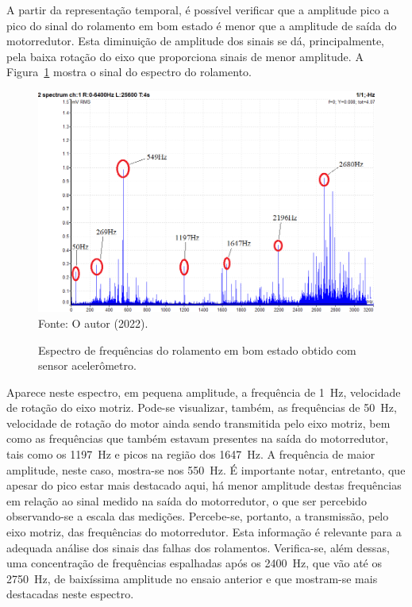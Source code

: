 \documentclass[
	12pt,				
	oneside,			
	a4paper,			
	english,			
	brazil,	
	sumario=abnt-6027-2012		
	]{abntex2ppgsi}
\begin{document}
A partir da representação temporal, é possível verificar que a amplitude pico a pico do sinal do rolamento em bom estado é menor que a amplitude de saída do motorredutor. Esta diminuição de amplitude dos sinais se dá, principalmente, pela baixa rotação do eixo que proporciona sinais de menor amplitude. A Figura~\ref{ROLAMENTO_BOM_ESTADO_ESPECTRO} mostra o sinal do espectro do rolamento. 

\begin{figure}[H]
\centering
\caption {Espectro de frequências do rolamento em bom estado obtido com sensor acelerômetro.}
\includegraphics[width=\textwidth,keepaspectratio]{espectro_rolamento_bom_mc6v_mv_anotado} \\
Fonte: O autor (2022).
\label{ROLAMENTO_BOM_ESTADO_ESPECTRO}
\end{figure}

Aparece neste espectro, em pequena amplitude, a frequência de \SI{1}{\hertz}, velocidade de rotação do eixo motriz. Pode-se visualizar, também, as frequências de \SI{50}{\hertz}, velocidade de rotação do motor ainda sendo transmitida pelo eixo motriz, bem como as frequências que também estavam presentes na saída do motorredutor, tais como os \SI{1197}{\hertz} e picos na região dos \SI{1647}{\hertz}. A frequência de maior amplitude, neste caso, mostra-se nos \SI{550}{\hertz}. É importante notar, entretanto, que apesar do pico estar mais destacado aqui, há menor amplitude destas frequências em relação ao sinal medido na saída do motorredutor, o que ser percebido observando-se a escala das medições. Percebe-se, portanto, a transmissão, pelo eixo motriz, das frequências do motorredutor. Esta informação é relevante para a adequada análise dos sinais das falhas dos rolamentos. Verifica-se, além dessas, uma concentração de frequências espalhadas após os \SI{2400}{\hertz}, que vão até os \SI{2750}{\hertz}, de baixíssima amplitude no ensaio anterior e que mostram-se mais destacadas neste espectro. 
\end{document}
